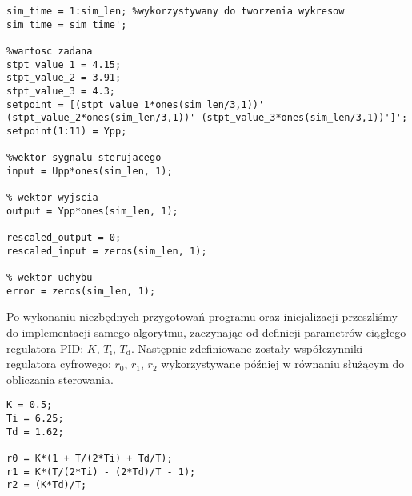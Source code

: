 \begin{lstlisting}[style=custommatlab,frame=single,label={zad4_wek_lst},caption={Inicjalizacja wektorów},captionpos=b]
%czas symulacji
sim_time = 1:sim_len; %wykorzystywany do tworzenia wykresow
sim_time = sim_time';

%wartosc zadana
stpt_value_1 = 4.15;
stpt_value_2 = 3.91;
stpt_value_3 = 4.3;
setpoint = [(stpt_value_1*ones(sim_len/3,1))' (stpt_value_2*ones(sim_len/3,1))' (stpt_value_3*ones(sim_len/3,1))']';
setpoint(1:11) = Ypp;

%wektor sygnalu sterujacego
input = Upp*ones(sim_len, 1);

% wektor wyjscia
output = Ypp*ones(sim_len, 1);

rescaled_output = 0;
rescaled_input = zeros(sim_len, 1);

% wektor uchybu
error = zeros(sim_len, 1);
\end{lstlisting}

Po wykonaniu niezbędnych przygotowań programu oraz inicjalizacji przeszliśmy do implementacji samego algorytmu, zaczynając od definicji parametrów ciągłego regulatora PID: $K$, $T_\mathrm{i}$, $T_\mathrm{d}$. Następnie zdefiniowane zostały współczynniki regulatora cyfrowego: $r_0$, $r_1$, $r_2$ wykorzystywane później w równaniu służącym do obliczania sterowania.
\\

\begin{lstlisting}[style=custommatlab,frame=single,label={zad4_param_lst},caption={Definicja współczynników regulatora PID},captionpos=b]
K = 0.5;
Ti = 6.25;
Td = 1.62;

r0 = K*(1 + T/(2*Ti) + Td/T);
r1 = K*(T/(2*Ti) - (2*Td)/T - 1);
r2 = (K*Td)/T;
\end{lstlisting}

